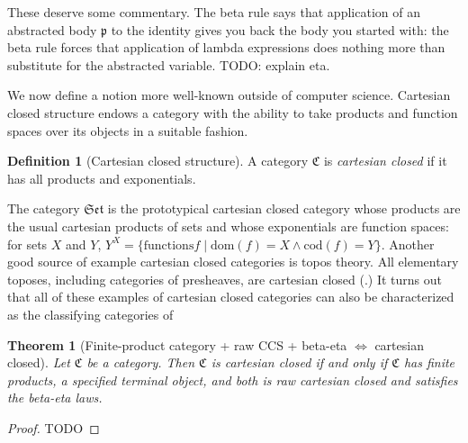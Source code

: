 \documentclass[12pt,twoside]{reedthesis}
\theoremstyle{definition}
\newtheorem{definition}{Definition}
\theoremstyle{remark}
\theoremstyle{plain}
\newtheorem{theorem}{Theorem}
\newcommand{\catset}{\mathfrak{Set}}
\begin{document}
These deserve some commentary. The beta rule says that application of an
abstracted body $\mathfrak{p}$ to the identity gives you back the body you
started with: the beta rule forces that application of lambda expressions does
nothing more than substitute for the abstracted variable. TODO: explain eta.

We now define a notion more well-known outside of computer science. Cartesian
closed structure endows a category with the ability to take products and
function spaces over its objects in a suitable fashion.
\begin{definition}[Cartesian closed structure]
  A category \( \mathfrak{C} \) is \emph{cartesian closed} if it has all
  products and exponentials.
\end{definition}

The category \( \catset \) is the prototypical cartesian closed category whose
products are the usual cartesian products of sets and whose exponentials are
function spaces: for sets $X$ and $Y$, \( Y^{X} = \{ \textrm{functions
} f \mid \textrm{dom}(f) = X \wedge \textrm{cod}(f) = Y \}\). Another good source of
example cartesian closed categories is topos theory. All elementary toposes,
including categories of presheaves, are cartesian closed
(\cite{leinster_informal_2011}.) It turns out that all of these examples of
cartesian closed categories can also be characterized as the classifying
categories of

\begin{theorem}[Finite-product category + raw CCS + beta-eta $\iff$ cartesian closed]
  Let \( \mathfrak{C} \) be a category. Then \( \mathfrak{C}\) is cartesian
  closed if and only if \( \mathfrak{C} \) has finite products, a specified
  terminal object, and both is raw cartesian closed and satisfies the beta-eta
  laws.
\end{theorem}
\begin{proof}
  TODO
\end{proof}
\end{document}
